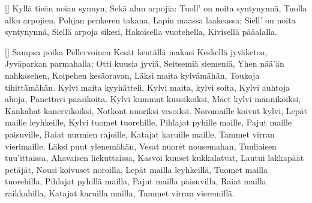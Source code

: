 []
  \beginverse
    Kyllä tieän noian synnyn,
    Sekä alun arpojia:
    Tuoll' on noita syntynynnä,
    Tuolla alku arpojien,
    Pohjan penkeren takana,
    Lapin maassa laakeassa;
    Siell' on noita syntynynnä,
    Siellä arpoja sikesi,
    Hakoisella vuotehella,
    Kivisellä pääalalla.
  \endverse
\endsong


[]
  \beginverse
    Sampsa poika Pellervoinen
    Kesät kentällä makasi
    Keskellä jyväketoa,
    Jyväparkan parmahalla;
    Otti kuusia jyviä,
    Seitsemiä siemeniä,
    Yhen nää'än nahkasehen,
    Koipehen kesäoravan,
    Läksi maita kylvämähän,
    Toukoja tihittämähän.
  \endverse
  \beginverse
    Kylvi maita kyyhätteli,
    Kylvi maita, kylvi soita,
    Kylvi auhtoja ahoja,
    Panettavi paasikoita.
    Kylvi kummut kuusikoiksi,
    Mäet kylvi männiköiksi,
    Kankahat kanervikoiksi,
    Notkont nuoriksi vesoiksi.
    Noromaille koivut kylvi,
    Lepät maille leyhkeille,
    Kylvi tuomet tuorehille,
    Pihlajat pyhille maille,
    Pajut maille paisuville,
    Raiat nurmien rajoille,
    Katajat karuille maille,
    Tammet virran vierimaille.
  \endverse
  \beginverse
    Läksi puut ylenemähän,
    Vesat nuoret nousemahan,
    Tuuliaisen tuu'ittaissa,
    Ahavaisen liekuttaissa,
    Kasvoi kuuset kukkalatvat,
    Lautui lakkapäät petäjät,
    Nousi koivuset noroilla,
    Lepät mailla leyhkeillä,
    Tuomet mailla tuorehilla,
    Pihlajat pyhillä mailla,
    Pajut mailla paisuvilla,
    Raiat mailla raikkahilla,
    Katajat karuilla mailla,
    Tammet virran vieremillä.
  \endverse
\endsong


